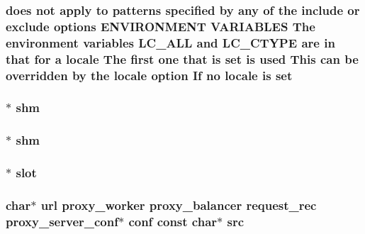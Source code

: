 \subsubsection[{\texorpdfstring{set}{set}}]{ does {\bf not} apply {\bf to} {\bf patterns} {\bf specified} by {\bf any} {\bf of} the {\bf include} {\bf or} {\bf exclude} {\bf options} E\+N\+V\+I\+R\+O\+N\+M\+E\+NT V\+A\+R\+I\+A\+B\+L\+ES The {\bf environment} {\bf variables} L\+C\+\_\+\+A\+LL and L\+C\+\_\+\+C\+T\+Y\+PE {\bf are} {\bf in} that for {\bf a} {\bf locale} The {\bf first} one that {\bf is} set {\bf is} {\bf used} This {\bf can} {\bf be} overridden by the {\bf locale} {\bf option} If no {\bf locale} {\bf is} set}\hypertarget{group__MOD__PROXY_ga59b90fe9d99507815e1cde68bac85922}{}\label{group__MOD__PROXY_ga59b90fe9d99507815e1cde68bac85922}
\subsubsection[{\texorpdfstring{shm}{shm}}]{ $\ast$ shm}\hypertarget{group__MOD__PROXY_gaa4ebe098e8dd67428afcaa1f9bca45bd}{}\label{group__MOD__PROXY_gaa4ebe098e8dd67428afcaa1f9bca45bd}
\subsubsection[{\texorpdfstring{shm}{shm}}]{$\ast$ shm}\hypertarget{group__MOD__PROXY_gaec43f3d756b1bc21a10fe86270cb2f44}{}\label{group__MOD__PROXY_gaec43f3d756b1bc21a10fe86270cb2f44}
\subsubsection[{\texorpdfstring{slot}{slot}}]{ $\ast$ slot}\hypertarget{group__MOD__PROXY_ga272f60c5e6cce1bfc743cd17b683d5a3}{}\label{group__MOD__PROXY_ga272f60c5e6cce1bfc743cd17b683d5a3}
\subsubsection[{\texorpdfstring{src}{src}}]{ char$\ast$ {\bf url} {\bf proxy\+\_\+worker} {\bf proxy\+\_\+balancer} {\bf request\+\_\+rec} {\bf proxy\+\_\+server\+\_\+conf}$\ast$ {\bf conf} const char$\ast$ src}\hypertarget{group__MOD__PROXY_ga750c51ef9d038414a4cb0467d7ac4c2a}{}\label{group__MOD__PROXY_ga750c51ef9d038414a4cb0467d7ac4c2a}
